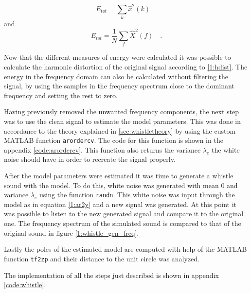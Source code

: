 \documentclass{IEEEtran}
\newcommand{\code}[1]{\texttt{#1}}
\begin{document}
\begin{equation}
E_{tot} = \sum_k{\hat{x}^2(k)} \quad
\end{equation}
and
\begin{equation}
E_{tot} = \frac{1}{N}\sum_f{\hat{X}^2(f)} \quad .
\end{equation}

Now that the different measures of energy were calculated it was possible to
calculate the harmonic distortion of the original signal according to
\ref{1:hdist}. The energy in the frequency domain can also be calculated
without filtering the signal, by using the samples in the frequency spectrum
close to the dominant frequency and setting the rest to zero.

Having previously removed the unwanted frequency components, the next
step was to use the clean signal to estimate the model parameters.
This was done in accordance to the theory explained in \ref{sec:whistletheory}
by using the custom MATLAB function \code{arordercv}. The code for this
function is shown in the appendix \ref{code:arordercv}. This function also
returns the variance $\lambda_e$ the white noise should have in order to
recreate the signal properly.

After the model parameters were estimated it was time to generate a whistle
sound with the model. To do this, white noise was generated with mean $0$
and variance $\lambda_e$ using the function \code{randn}. This white noise
was input through the model as in equation \ref{1:ar2y} and a new signal
was generated. At this point it was possible to listen to the new generated
signal and compare it to the original one. The frequency spectrum of the
simulated sound is compared to that of the original sound in figure
\ref{1:whistle_gen_freq}.

Lastly the poles of the estimated model are computed with help of the
MATLAB function \code{tf2zp} and their distance to the unit circle was
analyzed.

The implementation of all the steps just described is shown in appendix
\ref{code:whistle}.
\end{document}
